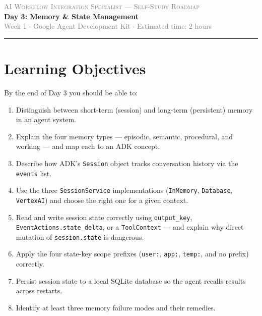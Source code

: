 \documentclass[12pt, a4paper]{article}
\begin{document}
\begin{center}
  {\small\textcolor{gray}{\textsc{AI Workflow Integration Specialist --- Self-Study Roadmap}}}\\[4pt]
  {\LARGE\bfseries\color{theoryblue} Day 3: Memory \& State Management}\\[6pt]
  {\small\textcolor{gray}{Week 1 $\cdot$ Google Agent Development Kit $\cdot$ Estimated time: 2 hours}}
\end{center}
\vspace{0.5em}
\hrule
\vspace{1.5em}

\section{Learning Objectives}

By the end of Day 3 you should be able to:

\begin{enumerate}[leftmargin=*, label=\textbf{\arabic*.}]
  \item Distinguish between short-term (session) and long-term (persistent) memory in an agent system.
  \item Explain the four memory types --- episodic, semantic, procedural, and working --- and map each to an ADK concept.
  \item Describe how ADK's \texttt{Session} object tracks conversation history via the \texttt{events} list.
  \item Use the three \texttt{SessionService} implementations (\texttt{InMemory}, \texttt{Database}, \texttt{VertexAI}) and choose the right one for a given context.
  \item Read and write session state correctly using \texttt{output\_key}, \texttt{EventActions.state\_delta}, or a \texttt{ToolContext} --- and explain why direct mutation of \texttt{session.state} is dangerous.
  \item Apply the four state-key scope prefixes (\texttt{user:}, \texttt{app:}, \texttt{temp:}, and no prefix) correctly.
  \item Persist session state to a local SQLite database so the agent recalls results across restarts.
  \item Identify at least three memory failure modes and their remedies.
\end{enumerate}
\end{document}
